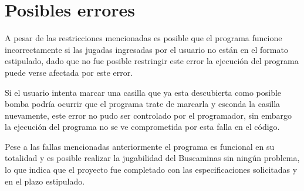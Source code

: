 \documentclass[letterpaper,12pt]{report}
\begin{document}
\section {Posibles errores}

A pesar de las restricciones mencionadas es posible que el programa funcione incorrectamente si las jugadas ingresadas por el usuario no están en el formato estipulado, dado que no fue posible restringir este error la ejecución del programa puede verse afectada por este error.

Si el usuario intenta marcar una casilla que ya esta descubierta como posible bomba podría ocurrir que el programa trate de marcarla y esconda la casilla nuevamente, este error no pudo ser controlado por el programador, sin embargo la ejecución del programa no se ve comprometida por esta falla en el código.

Pese a las fallas mencionadas anteriormente el programa es funcional en su totalidad y es posible realizar la jugabilidad del Buscaminas sin ningún problema, lo que indica que el proyecto fue completado con las especificaciones solicitadas y en el plazo estipulado.
\end{document}
